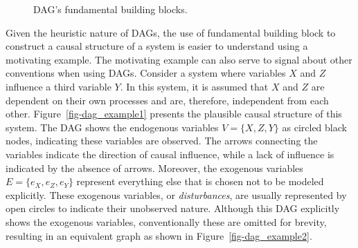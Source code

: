 \documentclass[
  authoryear,
  preprint,
  1p]{elsarticle}
\begin{document}
\begin{figure}
\begin{minipage}{0.33\linewidth}
{}


\end{minipage}%
%
\begin{minipage}{0.33\linewidth}



\end{minipage}%

\caption{\label{fig-dags}DAG's fundamental building blocks.}

\end{figure}%

Given the heuristic nature of DAGs, the use of fundamental building
block to construct a causal structure of a system is easier to
understand using a motivating example. The motivating example can also
serve to signal about other conventions when using DAGs. Consider a
system where variables \(X\) and \(Z\) influence a third variable \(Y\).
In this system, it is assumed that \(X\) and \(Z\) are dependent on
their own processes and are, therefore, independent from each other.
Figure~\ref{fig-dag_example1} presents the plausible causal structure of
this system. The DAG shows the endogenous variables \(V=\{X,Z,Y\}\) as
circled black nodes, indicating these variables are observed. The arrows
connecting the variables indicate the direction of causal influence,
while a lack of influence is indicated by the absence of arrows.
Moreover, the exogenous variables \(E=\{e_{X},e_{Z},e_{Y}\}\) represent
everything else that is chosen not to be modeled explicitly. These
exogenous variables, or \emph{disturbances}, are usually represented by
open circles to indicate their unobserved nature. Although this DAG
explicitly shows the exogenous variables, conventionally these are
omitted for brevity, resulting in an equivalent graph as shown in
Figure~\ref{fig-dag_example2}.
\end{document}
